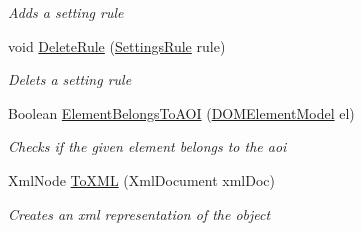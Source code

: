 \begin{DoxyCompactItemize}
\begin{DoxyCompactList}\small\item\em Adds a setting rule \end{DoxyCompactList}\item 
void \hyperlink{class_web_analyzer_1_1_models_1_1_settings_model_1_1_a_o_i_settings_a2e4c0faead8b85ebf0db0aaf6fe65699}{Delete\+Rule} (\hyperlink{class_web_analyzer_1_1_models_1_1_settings_model_1_1_settings_rule}{Settings\+Rule} rule)
\begin{DoxyCompactList}\small\item\em Delets a setting rule \end{DoxyCompactList}\item 
Boolean \hyperlink{class_web_analyzer_1_1_models_1_1_settings_model_1_1_a_o_i_settings_aa2c30a095d9e8495a0ad2c0926130600}{Element\+Belongs\+To\+A\+O\+I} (\hyperlink{class_web_analyzer_1_1_models_1_1_data_model_1_1_d_o_m_element_model}{D\+O\+M\+Element\+Model} el)
\begin{DoxyCompactList}\small\item\em Checks if the given element belongs to the aoi \end{DoxyCompactList}\item 
Xml\+Node \hyperlink{class_web_analyzer_1_1_models_1_1_settings_model_1_1_a_o_i_settings_a964658ea49f4f1018ce45653e5f05ffd}{To\+X\+M\+L} (Xml\+Document xml\+Doc)
\begin{DoxyCompactList}\small\item\em Creates an xml representation of the object \end{DoxyCompactList}\end{DoxyCompactItemize}
